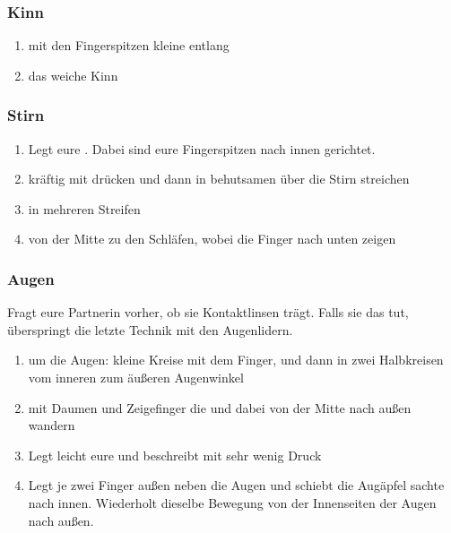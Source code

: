 \subsubsection{Kinn}
\begin{enumerate}
	\item mit den Fingerspitzen kleine  entlang
	\item das weiche Kinn 
\end{enumerate}


\subsubsection{Stirn}

\begin{enumerate}
	\item Legt eure . Dabei sind eure Fingerspitzen nach innen gerichtet.
	\item kräftig mit  drücken und dann in behutsamen  über die Stirn streichen
	\item {} in mehreren Streifen
	\item {} von der Mitte zu den Schläfen, wobei die Finger nach unten zeigen
\end{enumerate}

\subsubsection{Augen}

Fragt eure Partnerin vorher, ob sie Kontaktlinsen trägt. Falls sie das tut, überspringt die letzte Technik mit den Augenlidern.

\begin{enumerate}
	\item {} um die Augen: kleine Kreise mit dem Finger, und dann in zwei Halbkreisen vom inneren zum äußeren Augenwinkel
	\item mit Daumen und Zeigefinger die  und dabei von der Mitte nach außen wandern
	\item Legt leicht eure  und beschreibt mit sehr wenig Druck 
	\item {} Legt je zwei Finger außen neben die Augen und schiebt die Augäpfel sachte nach innen. Wiederholt dieselbe Bewegung von der Innenseiten der Augen nach außen.
\end{enumerate}


